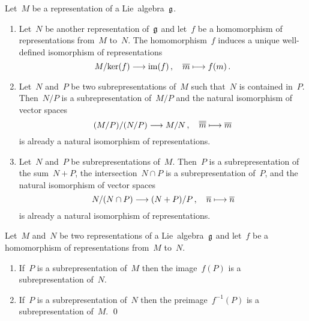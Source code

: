 \begin{corollary}
  Let~$M$ be a representation of a Lie~algebra~$\mathfrak{g}$.
  \begin{enumerate}
    \item
      Let~$N$ be another representation of~$\mathfrak{g}$ and let~$f$ be a homomorphism of representations from~$M$ to~$N$.
      The homomorphism~$f$ induces a unique well-defined isomorphism of representations
      \[
        M/{\ker(f)}
        \to
        \im(f) \,,
        \quad
        \class{m}
        \mapsto
        f(m)  \,.
      \]
    \item
      Let~$N$ and~$P$ be two subrepresentations of~$M$ such that~$N$ is contained in~$P$.
      Then~$N/P$ is a subrepresentation of~$M/P$ and the natural isomorphism of vector spaces
      \[
        (M/P) / (N/P)
        \to
        M/N \,,
        \quad
        \class{\class{m}}
        \mapsto
        \class{m}
      \]
      is already a natural isomorphism of representations.
    \item
      Let~$N$ and~$P$ be subrepresentations of~$M$.
      Then~$P$ is a subrepresentation of the sum~$N+P$, the intersection~$N \cap P$ is a subrepresentation of~$P$, and the natural isomorphism of vector spaces
      \[
        N/(N \cap P)
        \to
        (N + P)/P  \,,
        \quad
        \class{n}
        \mapsto
        \class{n}
      \]
      is already a natural isomorphism of representations.
  \end{enumerate}
\end{corollary}


\begin{lemma}
  Let~$M$ and~$N$ be two representations of a Lie~algebra~$\mathfrak{g}$ and let~$f$ be a homomorphism of representations from~$M$ to~$N$.
  \begin{enumerate}
    \item
      If~$P$ is a subrepresentation of~$M$ then the image~$f(P)$ is a subrepresentation of~$N$.
    \item
      If~$P$ is a subrepresentation of~$N$ then the preimage~$f^{-1}(P)$ is a subrepresentation of~$M$.
    \qed
  \end{enumerate}
\end{lemma}


